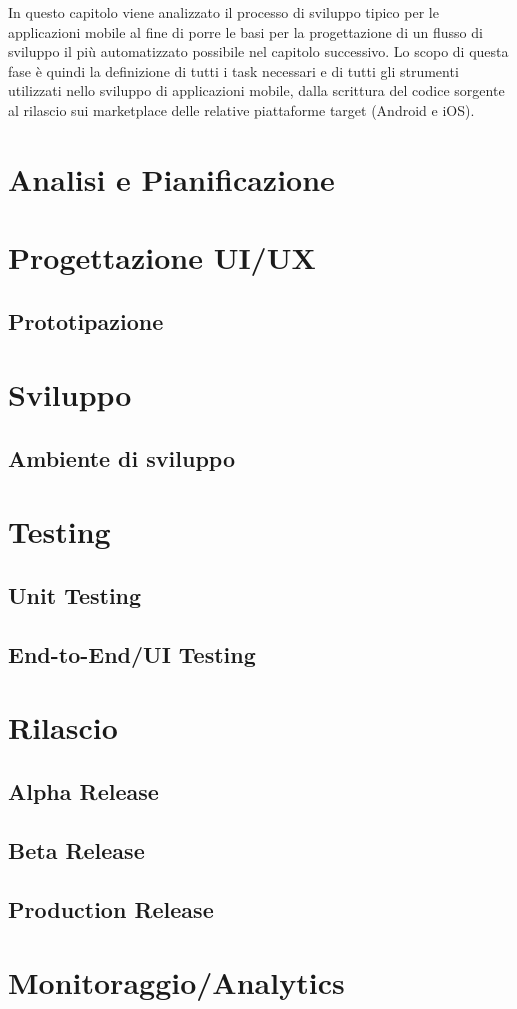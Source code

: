 
In questo capitolo viene analizzato il processo di sviluppo tipico per le applicazioni mobile al fine di porre le basi per la progettazione di un flusso di sviluppo il più automatizzato possibile nel capitolo successivo. Lo scopo di questa fase è quindi la definizione di tutti i task necessari e di tutti gli strumenti utilizzati nello sviluppo di applicazioni mobile, dalla scrittura del codice sorgente al rilascio sui marketplace delle relative piattaforme target (Android e iOS).
\section{Analisi e Pianificazione}
\section{Progettazione UI/UX}
\subsection{Prototipazione}
\section{Sviluppo}
\subsection{Ambiente di sviluppo}
\section{Testing}
\subsection{Unit Testing}
\subsection{End-to-End/UI Testing}
\section{Rilascio}
\subsection{Alpha Release}
\subsection{Beta Release}
\subsection{Production Release}

\section{Monitoraggio/Analytics}
